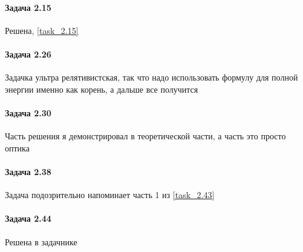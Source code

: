 \documentclass[12pt]{article}
\begin{document}
\paragraph{Задача 2.15} Решена, \ref{task_2.15}
\paragraph{Задача 2.26} Задачка ультра релятивистская, так что надо использовать формулу для полной энергии именно как корень, а дальше все получится
\paragraph{Задача 2.30} Часть решения я демонстрировал в теоретической части, а часть это просто оптика
\paragraph{Задача 2.38} Задача подозрительно напоминает часть 1 из \ref{task_2.43}
\paragraph{Задача 2.44} Решена в задачнике
\end{document}

